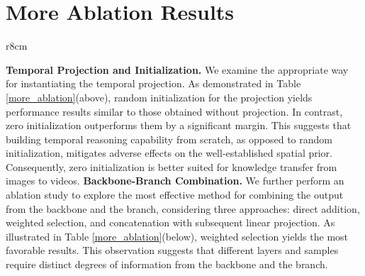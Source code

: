 \documentclass{article} \usepackage{iclr2024_conference,times}
\begin{document}
\section{More Ablation Results} \label{appendix_ablation}

\begin{wraptable}{r}{8cm}
\setlength{\tabcolsep}{3pt}
\begin{center}
    \vspace{-1em}
      \caption{\small Ablation Studies on Temporal Projection and Backbone-Branch Combination.} 
      \vspace{-1em}
      \renewcommand\tabcolsep{9pt}
    \end{center}
    \vspace{-1.5em}
\end{wraptable}

\textbf{Temporal Projection and Initialization.} We examine the appropriate way for instantiating the temporal projection. As demonstrated in Table \ref{more_ablation}(above), random initialization for the projection yields performance results similar to those obtained without projection. In contrast, zero initialization outperforms them by a significant margin. This suggests that building temporal reasoning capability from scratch, as opposed to random initialization, mitigates adverse effects on the well-established spatial prior. Consequently, zero initialization is better suited for knowledge transfer from images to videos. \textbf{Backbone-Branch Combination.} We further perform an ablation study to explore the most effective method for combining the output from the backbone and the branch, considering three approaches: direct addition, weighted selection, and concatenation with subsequent linear projection. As illustrated in Table \ref{more_ablation}(below), weighted selection yields the most favorable results. This observation suggests that different layers and samples require distinct degrees of information from the backbone and the branch.
\end{document}
